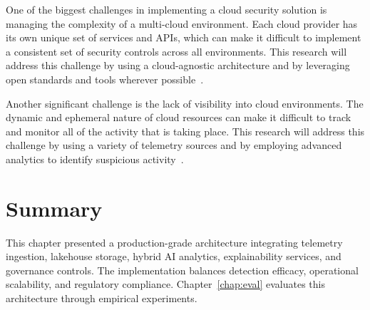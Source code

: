 One of the biggest challenges in implementing a cloud security solution is managing the complexity of a multi-cloud environment. Each cloud provider has its own unique set of services and APIs, which can make it difficult to implement a consistent set of security controls across all environments. This research will address this challenge by using a cloud-agnostic architecture and by leveraging open standards and tools wherever possible~\cite{spot2024multicloud}.

Another significant challenge is the lack of visibility into cloud environments. The dynamic and ephemeral nature of cloud resources can make it difficult to track and monitor all of the activity that is taking place. This research will address this challenge by using a variety of telemetry sources and by employing advanced analytics to identify suspicious activity~\cite{cycognito2024visibility}.

\section{Summary}
This chapter presented a production-grade architecture integrating telemetry ingestion, lakehouse storage, hybrid AI analytics, explainability services, and governance controls. The implementation balances detection efficacy, operational scalability, and regulatory compliance. Chapter~\ref{chap:eval} evaluates this architecture through empirical experiments.
